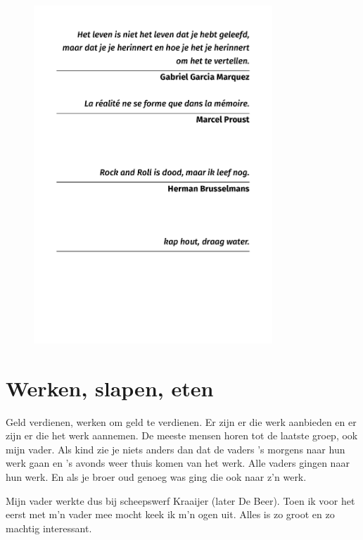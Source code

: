 \documentclass[10pt,twoside, openright]{memoir}
\begin{document}
\thispagestyle{empty}
\begin{flushright}
\begin{figure}
\includegraphics[width=0.8\textwidth, right]{img/epi/epi2}
\end{figure}
\end{flushright}

\chapter{Werken, slapen, eten} %
\label{cha:werkenslapen}

Geld verdienen, werken om geld te verdienen. Er zijn er die werk aanbieden en er zijn er die het werk aannemen. De meeste mensen horen tot de laatste groep, ook mijn vader. Als kind zie je niets anders dan dat de vaders ’s morgens naar hun werk gaan en ’s avonds weer thuis komen van het werk. Alle vaders gingen naar hun werk. En als je broer oud genoeg was ging die ook naar z’n werk.

Mijn vader werkte dus bij scheepswerf Kraaijer (later De Beer). Toen ik voor het eerst met m’n vader mee mocht keek ik m’n ogen uit. Alles is zo groot en zo machtig interessant.
\end{document}
